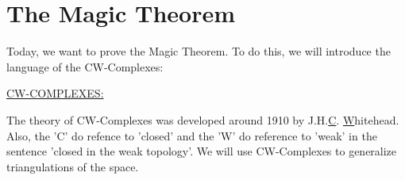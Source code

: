 \chapter{The Magic Theorem}


Today, we want to prove the Magic Theorem. To do this, we will introduce the language of the CW-Complexes: \newline

\underline{CW-COMPLEXES:}
\begin{obs} The theory of CW-Complexes was developed around 1910 by J.H.\underline{C}. \underline{W}hitehead. Also, the 'C' do refence to 'closed' and the 'W' do reference to 'weak' in the sentence 'closed in the weak topology'. \newline
We will use CW-Complexes to generalize triangulations of the space.
\end{obs}

